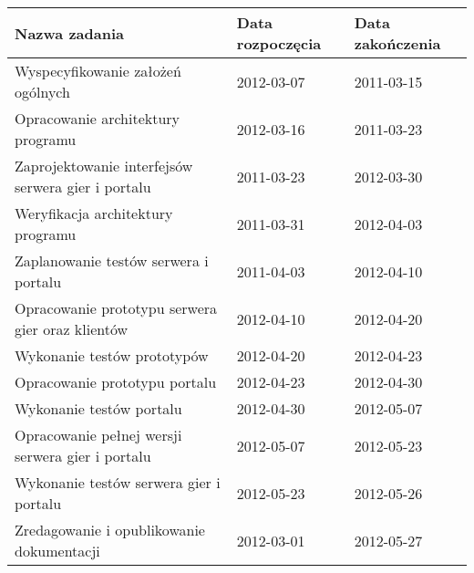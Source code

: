 \documentclass[11pt,leqno]{article}
\begin{document}
\begin{comment}
\begin{center}
\thispagestyle{empty}
{\Large Studencka Pracownia Inżynierii Oprogramowania}\\[0.5cm]
{\Large Zespół nr 8, IIUWr 2011/12}\\[2.5cm]

{\large Marcin Januszkiewicz, Piotr Sobczyk}\\[0.5cm]
{\huge Dokumentacja projektu \textbf{Tarantula}}\\[0.5cm]
{\huge Harmonogram realizacji projektu}\\[0.5cm]
\vfill
{\large Wrocław, \today}

\end{center}

\newpage
\end{comment}
\newpage

\begin{landscape}
\begin{tabular}{|p{10cm}|l|l|}
\hline
\bf{Nazwa zadania} & \bf{Data rozpoczęcia} & \bf{Data zakończenia} \\ \hline
Wyspecyfikowanie założeń ogólnych                         & 2012-03-07 & 2011-03-15 \\ \hline
Opracowanie architektury programu                         & 2012-03-16 & 2011-03-23 \\ \hline
Zaprojektowanie interfejsów serwera gier i portalu        & 2011-03-23 & 2012-03-30 \\ \hline
Weryfikacja architektury programu                         & 2011-03-31 & 2012-04-03 \\ \hline
Zaplanowanie testów serwera i portalu                     & 2011-04-03 & 2012-04-10 \\ \hline
Opracowanie prototypu serwera gier oraz klientów          & 2012-04-10 & 2012-04-20 \\ \hline
Wykonanie testów prototypów                               & 2012-04-20 & 2012-04-23 \\ \hline
Opracowanie prototypu portalu                             & 2012-04-23 & 2012-04-30 \\ \hline
Wykonanie testów portalu                                  & 2012-04-30 & 2012-05-07 \\ \hline
Opracowanie pełnej wersji serwera gier i portalu          & 2012-05-07 & 2012-05-23 \\ \hline
Wykonanie testów serwera gier i portalu                   & 2012-05-23 & 2012-05-26 \\ \hline
Zredagowanie i opublikowanie dokumentacji                 & 2012-03-01 & 2012-05-27 \\ \hline
\end{tabular}


\end{landscape}
\end{document}
